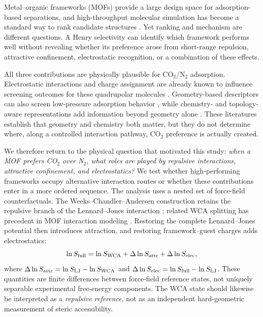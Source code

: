 \documentclass[11pt,a4paper]{article}
\begin{document}
Metal--organic frameworks (MOFs) provide a large design space for adsorption-based separations, and high-throughput molecular simulation has become a standard way to rank candidate structures \cite{haldoupis2012charges,burner2023arcmof}. Yet ranking and mechanism are different questions. A Henry selectivity can identify which framework performs well without revealing whether its preference arose from short-range repulsion, attractive confinement, electrostatic recognition, or a combination of these effects.

All three contributions are physically plausible for CO$_2$/N$_2$ adsorption. Electrostatic interactions and charge assignment are already known to influence screening outcomes for these quadrupolar molecules \cite{haldoupis2012charges,daglar2018screening}. Geometry-based descriptors can also screen low-pressure adsorption behavior \cite{fernandez2016geometry}, while chemistry- and topology-aware representations add information beyond geometry alone \cite{anderson2018porechemistry,moosavi2020diversity,burner2020deeplearning}. These literatures establish that geometry and chemistry both matter, but they do not determine where, along a controlled interaction pathway, CO$_2$ preference is actually created.

We therefore return to the physical question that motivated this study: \emph{when a MOF prefers CO$_2$ over N$_2$, what roles are played by repulsive interactions, attractive confinement, and electrostatics?} We test whether high-performing frameworks occupy alternative interaction routes or whether these contributions enter in a more ordered sequence. The analysis uses a nested set of force-field counterfactuals. The Weeks--Chandler--Andersen construction retains the repulsive branch of the Lennard--Jones interaction \cite{weeks1971wca}; related WCA splitting has precedent in MOF interaction modeling \cite{campbell2018polar}. Restoring the complete Lennard--Jones potential then introduces attraction, and restoring framework--guest charges adds electrostatics:
\begin{equation}
\ln S_{\rm full}
=
\ln S_{\rm WCA}
+
\Delta\ln S_{\rm attr}
+
\Delta\ln S_{\rm elec},
\end{equation}
where
$\Delta\ln S_{\rm attr}=\ln S_{\rm LJ}-\ln S_{\rm WCA}$
and
$\Delta\ln S_{\rm elec}=\ln S_{\rm full}-\ln S_{\rm LJ}$.
These quantities are finite differences between force-field reference states, not uniquely separable experimental free-energy components. The WCA state should likewise be interpreted as a \emph{repulsive reference}, not as an independent hard-geometric measurement of steric accessibility.
\end{document}
